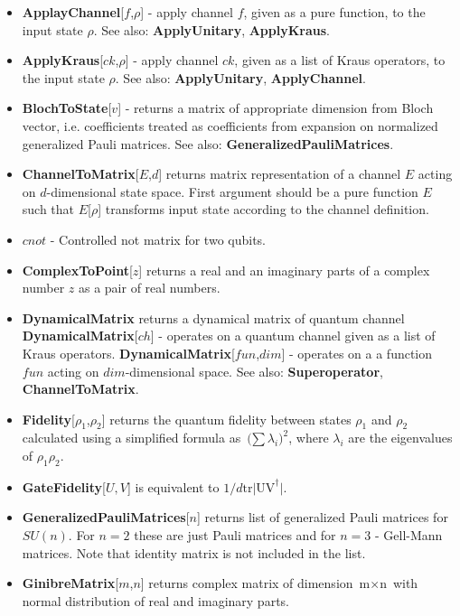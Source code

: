 \documentclass[a4paper,10pt]{scrartcl}
\begin{document}
\begin{itemize} 
\item  \textbf{ApplayChannel}[$f$,$\rho$] - apply channel $f$, given as a pure function, to the input state $\rho$. See also: \textbf{ApplyUnitary}, \textbf{ApplyKraus}.
\item  \textbf{ApplyKraus}[$ck$,$\rho$] - apply channel $ck$, given as a list of Kraus operators, to the input state $\rho$. See also: \textbf{ApplyUnitary}, \textbf{ApplyChannel}.
\item  \textbf{BlochToState}[$v$] - returns a matrix of appropriate dimension from Bloch vector, i.e. coefficients treated as coefficients from expansion on normalized generalized Pauli matrices. See also: \textbf{GeneralizedPauliMatrices}.
\item  \textbf{ChannelToMatrix}[$E$,$d$] returns matrix representation of a channel $E$ acting on $d$-dimensional state space. First argument should be a pure function $E$ such that $E$[$\rho$] transforms input state according to the channel definition.
\item  $cnot$ - Controlled not matrix for two qubits.
\item  \textbf{ComplexToPoint}[$z$] returns a real and an imaginary parts of a complex number $z$ as a pair of real numbers.
\item  \textbf{DynamicalMatrix} returns a dynamical matrix of quantum channel\newline{}
\textbf{DynamicalMatrix}[$ch$] -  operates on a quantum channel given as a list of Kraus operators.\newline{}
\textbf{DynamicalMatrix}[$fun$,$dim$]  - operates on a a function $fun$ acting on $dim$-dimensional space. \newline{}
See also: \textbf{Superoperator}, \textbf{ChannelToMatrix}.
\item  \textbf{Fidelity}[$\rho _1$,$\rho _2$] returns the quantum fidelity between states $\rho _1$ and $\rho _2$ calculated using a simplified formula as $\text{($\sum $}\lambda _i)^2$, where $\lambda _i$ are the eigenvalues of $\rho _1\rho _2$.
\item  \textbf{GateFidelity}[$U,V$] is equivalent to $1/d\text{tr$|$UV} ^{\dagger }|$.
\item  \textbf{GeneralizedPauliMatrices}[$n$] returns list of generalized Pauli matrices for $SU(n)$. For $n=2$ these are just Pauli matrices and for $n=3$ - Gell-Mann matrices. Note that identity matrix is not included in the list.
\item  \textbf{GinibreMatrix}[$m$,$n$] returns complex matrix of dimension $\text{m$\times $n}$ with normal distribution of real and imaginary parts.

\end{itemize}
\end{document}
